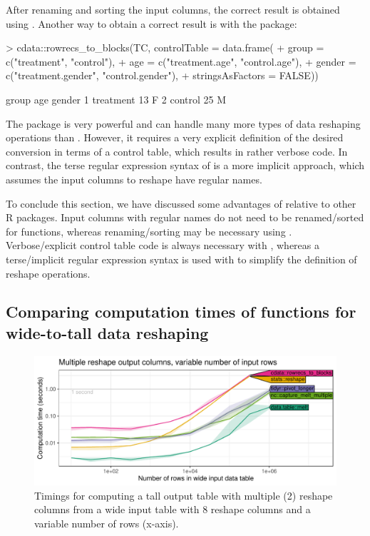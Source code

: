 After renaming and sorting the input columns, the correct result is
obtained using . Another way to obtain a
correct result is with the  package:

\begin{Schunk}
\begin{Sinput}
> cdata::rowrecs_to_blocks(TC, controlTable = data.frame(
+   group = c("treatment", "control"),
+   age = c("treatment.age", "control.age"),
+   gender = c("treatment.gender", "control.gender"),
+   stringsAsFactors = FALSE))
\end{Sinput}
\begin{Soutput}
      group age gender
1 treatment  13      F
2   control  25      M
\end{Soutput}
\end{Schunk}

The  package is very powerful and can handle many
more types of data reshaping operations than . However, it
requires a very explicit definition of the desired conversion in terms
of a control table, which results in rather verbose code. In contrast,
the terse regular expression syntax of  is a more implicit
approach, which assumes the input columns to reshape have regular
names.

To conclude this section, we have discussed some advantages of
 relative to other R packages. Input columns with regular
names do not need to be renamed/sorted for  functions, whereas
renaming/sorting may be necessary using
. Verbose/explicit control table code is always
necessary with , whereas a terse/implicit regular
expression syntax is used with  to simplify the definition of
reshape operations.

\subsection{Comparing computation times of functions for
  wide-to-tall data reshaping}

\begin{figure}
  \centering 
  \includegraphics[width = \textwidth]{figure-iris-rows-new.pdf}
  \vskip -0.3cm
  \caption{
    Timings for computing a tall output table with multiple (2)
    reshape columns from a wide input table with
    8 reshape columns and
    a variable number of rows
    (x-axis).}
  \label{fig:timings-multiple-rows}
\end{figure}

